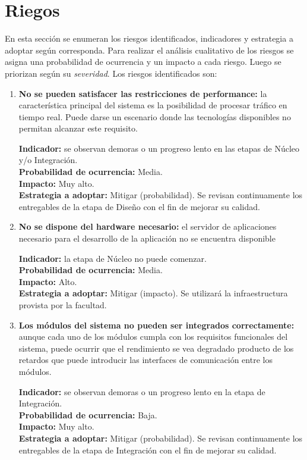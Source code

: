 \section*{Riegos}

En esta sección se enumeran los riesgos identificados, indicadores y estrategia a adoptar según corresponda. Para realizar el análisis cualitativo de los riesgos se asigna una probabilidad de ocurrencia y un impacto a cada riesgo. Luego se priorizan según su \textit{severidad}. Los riesgos identificados son:

\begin{enumerate}
\item \textbf{No se pueden satisfacer las restricciones de performance:} la característica principal del sistema es la posibilidad de procesar tráfico en tiempo real. Puede darse un escenario donde las tecnologías disponibles no permitan alcanzar este requisito.

\textbf{Indicador:} se observan demoras o un progreso lento en las etapas de Núcleo y/o Integración. \\
\textbf{Probabilidad de ocurrencia:} Media. \\
\textbf{Impacto:} Muy alto. \\
\textbf{Estrategia a adoptar:} Mitigar (probabilidad).
Se revisan continuamente los entregables de la etapa de Diseño con el fin de mejorar su calidad.

\item \textbf{No se dispone del hardware necesario:} el servidor de aplicaciones necesario para el desarrollo de la aplicación no se encuentra disponible

\textbf{Indicador:} la etapa de Núcleo no puede comenzar. \\
\textbf{Probabilidad de ocurrencia:} Media. \\
\textbf{Impacto:} Alto. \\
\textbf{Estrategia a adoptar:} Mitigar (impacto).
Se utilizará la infraestructura provista por la facultad.

\item \textbf{Los módulos del sistema no pueden ser integrados correctamente:} aunque cada uno de los módulos cumpla con los requisitos funcionales del sistema, puede ocurrir que el rendimiento se vea degradado producto de los retardos que puede introducir las interfaces de comunicación entre los módulos.

\textbf{Indicador:} se observan demoras o un progreso lento en la etapa de Integración. \\
\textbf{Probabilidad de ocurrencia:} Baja. \\
\textbf{Impacto:} Muy alto. \\
\textbf{Estrategia a adoptar:} Mitigar (probabilidad).
Se revisan continuamente los entregables de la etapa de Integración con el fin de mejorar su calidad.


\end{enumerate}
